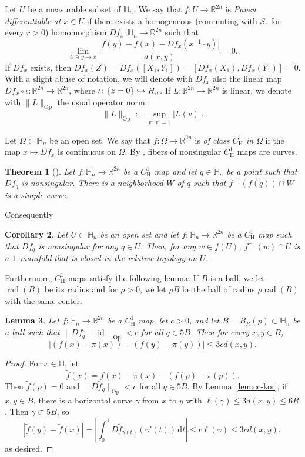 \documentclass[12pt,reqno]{amsart}
\DeclareMathOperator{\rad}{rad}
\newcommand{\HH}{\mathbb{H}}
\newcommand{\R}{\mathbb{R}}
\newcommand{\ud}[0]{\,\mathrm{d}}
\newcommand{\from}{\colon}
\newtheorem{thm}{Theorem}[section]
\newtheorem{lemma}[thm]{Lemma}
\newtheorem{cor}[thm]{Corollary}
\theoremstyle{remark}
\newcommand{\0}{\mathbf{0}}
\renewcommand{\1}{\mathbf 1}
\DeclareMathOperator{\id}{id}
\begin{document}
Let $U$ be a measurable subset of $\HH_n$. We say that $f\from U\to\mathbb R^{2n}$ is {\em Pansu differentiable at $x\in U$} if there exists a homogeneous (commuting with $S_r$ for every $r>0$) homomorphism $Df_x\from\HH_n\to\mathbb R^{2n}$ such that
\begin{equation}\label{eqn:PDiff}
\lim_{U\ni y\to x}\frac{|f(y)-f(x)-Df_x(x^{-1}\cdot y)|}{d(x,y)}=0.
\end{equation}
If $Df_x$ exists, then $Df_x( Z)= Df_x([X_1,Y_1])=[Df_x(X_1),Df_x(Y_1)]=0$. With a slight abuse of notation, we will denote with $Df_x$ also the linear map $ Df_x\circ\iota\from \mathbb R^{2n}\to\mathbb R^{2n}$, where $\iota\from\{z=0\}\hookrightarrow \mathbb \HH_n$. If $L\from\mathbb R^{2n}\to\mathbb R^{2n}$ is linear, we denote with $\|L\|_{\mathrm{Op}}$ the usual operator norm:
\[
\|L\|_{\mathrm{Op}}:=\sup_{v:|v|=1} |L(v)|.
\]


Let $\Omega\subset \HH_n$ be an open set. We say that $f\from\Omega\to\mathbb R^{2n}$ is {\em of class $C^1_{\mathrm H}$ in $\Omega$} if the map $x\mapsto Df_x$ is continuous on $\Omega$. By \cite[Theorem 5.3.7]{Kozhevnikov}, fibers of nonsingular $C^1_{\mathrm H}$ maps are curves.
\begin{thm}[{\cite[Theorem 5.3.7]{Kozhevnikov}}]
  Let $f\from \HH_n \to \R^{2n}$ be a $C^1_{\mathrm{H}}$ map and let $q\in \HH_n$ be a point such that $Df_q$ is nonsingular. There is a neighborhood $W$ of $q$ such that $f^{-1}(f(q))\cap W$ is a simple curve.
\end{thm}
Consequently
\begin{cor}\label{cor:nonsingular}
  Let $U\subset \HH_n$ be an open set and let $f\from \HH_n \to \R^{2n}$ be a $C^1_{\mathrm{H}}$ map such that $Df_q$ is nonsingular for any $q\in U$. Then, for any $w\in f(U)$, $f^{-1}(w)\cap U$ is a $1$--manifold that is closed in the relative topology on $U$.
\end{cor}

Furthermore, $C^1_{\mathrm{H}}$ maps satisfy the following lemma. If $B$ is a ball, we let $\rad(B)$ be its radius and for $\rho>0$, we let $\rho B$ be the ball of radius $\rho \rad(B)$ with the same center.
\begin{lemma}\label{lem:ControlF}
  Let $f\from \HH_n\to \R^{2n}$ be a $C^1_{\mathrm{H}}$ map, let $c>0$, and let $B=B_R(p)\subset \HH_n$ be a ball such that $\|Df_q - \id\|_{\mathrm{Op}}<c$ for all $q\in 5B$. Then for every $x,y\in B$,
  \begin{equation}\label{eq:ControlFPrel}
    |(f(x)-\pi(x))-(f(y)-\pi(y))|\le 3c d(x,y).
  \end{equation}
\end{lemma}
\begin{proof}
  For $x\in \HH$, let
  $$\tilde f(x)=f(x)-\pi(x)-(f(p)-\pi(p)).$$
  Then $\tilde{f}(p) = 0$ and $\|D\tilde{f}_q\|_{\mathrm{Op}}<c$ for all $q\in 5B$. By Lemma~\ref{lem:cc-kor}, if $x,y \in B$, there is a horizontal curve $\gamma$ from $x$ to $y$ with $\ell(\gamma) \le 3d(x,y) \le 6R$. Then $\gamma\subset 5B$, so 
  $$|\tilde{f}(y) - \tilde{f}(x)| = \left|\int_0^1 D\tilde{f}_{\gamma(t)}(\gamma'(t))\ud t\right| \le c \ell(\gamma) \le 3 c d(x,y),$$
  as desired.
\end{proof}
\end{document}
